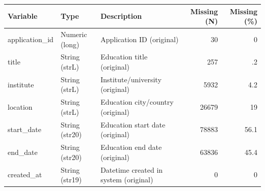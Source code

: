 \begin{threeparttable}


\begin{tabular}{@{}lllrr@{}}


\toprule


\textbf{Variable} & \textbf{Type} & \textbf{Description} & \textbf{Missing (N)} & \textbf{Missing (\%)} \\


\midrule


\midrule
application\_id & Numeric (long) & Application ID (original)&          30&           0\\
title & String (strL) & Education title (original)&         257&          .2\\
institute & String (strL) & Institute/university (original)&        5932&         4.2\\
location & String (strL) & Education city/country (original)&       26679&          19\\
start\_date & String (str20) & Education start date (original)&       78883&        56.1\\
end\_date & String (str20) & Education end date (original)&       63836&        45.4\\
created\_at & String (str19) & Datetime created in system (original)&           0&           0\\
\bottomrule


\end{tabular}


\end{threeparttable}
